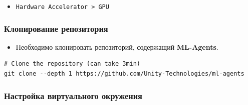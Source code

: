 \documentclass[11pt,a4paper]{article}
\begin{document}

\begin{itemize}
\tightlist
\item
  \texttt{Hardware\ Accelerator\ \textgreater{}\ GPU}
\end{itemize}


\subsubsection{Клонирование репозитория}\label{clone-the-repository}

\begin{itemize}
\tightlist
\item
  Необходимо клонировать репозиторий, содержащий \textbf{ML-Agents}.
\end{itemize}

\begin{lstlisting}
# Clone the repository (can take 3min)
git clone --depth 1 https://github.com/Unity-Technologies/ml-agents
\end{lstlisting}

\subsubsection{Настройка виртуального окружения}\label{setup-the-virtual-environment}
\end{document}
